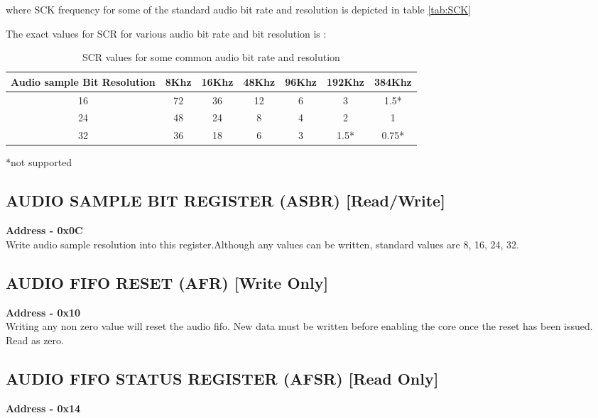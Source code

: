 \documentclass[12pt,a4paper]{report}
\begin{document}
where SCK frequency for some of the standard audio bit rate and resolution is depicted in table \ref{tab:SCK}

The exact values for SCR for various audio bit rate and bit resolution is :
\begin{table} [ht]
\begin{center}
\begin{tabular}{|c|c|c|c|c|c|c| } 
 \hline
Audio sample Bit Resolution  &  8Khz &  16Khz  &  48Khz  &  96Khz & 192Khz & 384Khz \\ 
 \hline         
16   &   72   &    36     &  12   &  6  &    3    &   1.5* \\
 \hline
24  &    48  &    24    &   8    &   4   &   2    &   1  \\
 \hline
32  &   36   &   18     &  6    &  3   &  1.5* &   0.75*  \\
\hline
 \end{tabular}
\caption{\label{tab:SCR} SCR values for some common audio bit rate and resolution}
*not supported
\end{center}
\end{table}

\subsection{AUDIO SAMPLE BIT REGISTER  (ASBR)  [Read/Write] }
\hspace{1.6cm}
\textbf{Address - 0x0C}
\\
Write audio sample resolution into this register.Although any values can be written, standard values are 8, 16, 24, 32.





\subsection{AUDIO FIFO RESET  (AFR)  [Write Only] }
\hspace{1.6cm}
\textbf{Address - 0x10}
\\
Writing any non zero value will reset the audio fifo. New data must be written before enabling the core once the reset has been issued. Read as zero.


\subsection{AUDIO FIFO STATUS REGISTER  (AFSR)  [Read Only] }
\hspace{1.6cm}
\textbf{Address - 0x14}
\end{document}
